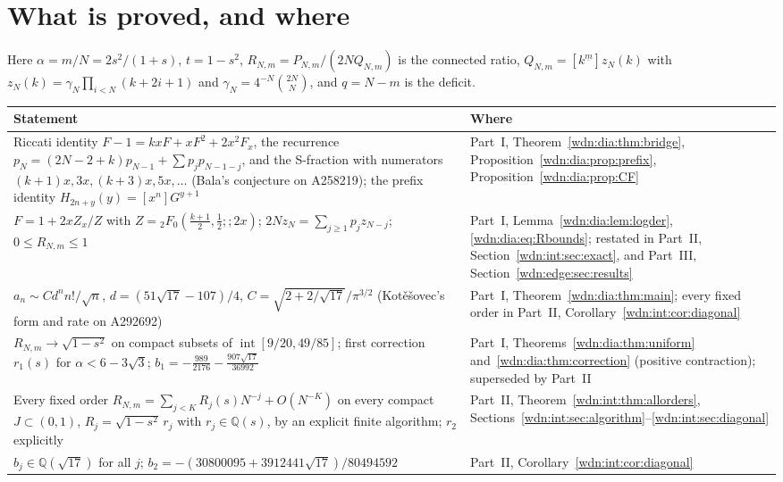 \documentclass[11pt,letterpaper]{article}
\theoremstyle{remark}\newtheorem{remark}[theorem]{Remark}
\newcommand{\fall}[2]{#1^{\underline{#2}}}
\newcommand{\Q}{\mathbb Q}
\begin{document}
\section*{What is proved, and where}\label{wdn:sec:status}
Here $\alpha=m/N=2s^2/(1+s)$, $t=1-s^2$, $R_{N,m}=P_{N,m}/(2NQ_{N,m})$ is the connected ratio, $Q_{N,m}=[\fall km]z_N(k)$ with $z_N(k)=\gamma_N\prod_{i<N}(k+2i+1)$ and $\gamma_N=4^{-N}\binom{2N}N$, and $q=N-m$ is the deficit.
\begin{center}
\small
\begin{tabular}{@{}>{\raggedright\arraybackslash}p{} >{\raggedright\arraybackslash}p{}@{}}
\toprule
Statement & Where\\
\midrule
Riccati identity $F-1=kxF+xF^2+2x^2F_x$, the recurrence $p_N=(2N-2+k)p_{N-1}+\sum p_jp_{N-1-j}$, and the S-fraction with numerators $(k+1)x,3x,(k+3)x,5x,\ldots$ (Bala's conjecture on A258219); the prefix identity $H_{2n+y}(y)=[x^n]G^{y+1}$ & Part~I, Theorem~\ref{wdn:dia:thm:bridge}, Proposition~\ref{wdn:dia:prop:prefix}, Proposition~\ref{wdn:dia:prop:CF}\\
$F=1+2xZ_x/Z$ with $Z={}_2F_0(\frac{k+1}2,\frac12;;2x)$; $2Nz_N=\sum_{j\ge1}p_jz_{N-j}$; $0\le R_{N,m}\le1$ & Part~I, Lemma~\ref{wdn:dia:lem:logder}, \eqref{wdn:dia:eq:Rbounds}; restated in Part~II, Section~\ref{wdn:int:sec:exact}, and Part~III, Section~\ref{wdn:edge:sec:results}\\
$a_n\sim Cd^nn!/\sqrt n$, $d=(51\sqrt{17}-107)/4$, $C=\sqrt{2+2/\sqrt{17}}/\pi^{3/2}$ (Kot\v{e}\v{s}ovec's form and rate on A292692) & Part~I, Theorem~\ref{wdn:dia:thm:main}; every fixed order in Part~II, Corollary~\ref{wdn:int:cor:diagonal}\\
$R_{N,m}\to\sqrt{1-s^2}$ on compact subsets of $\operatorname{int}[9/20,49/85]$; first correction $r_1(s)$ for $\alpha<6-3\sqrt3$; $b_1=-\frac{989}{2176}-\frac{907\sqrt{17}}{36992}$ & Part~I, Theorems~\ref{wdn:dia:thm:uniform} and~\ref{wdn:dia:thm:correction} (positive contraction); superseded by Part~II\\
Every fixed order $R_{N,m}=\sum_{j<K}R_j(s)N^{-j}+O(N^{-K})$ on every compact $J\subset(0,1)$, $R_j=\sqrt{1-s^2}\,r_j$ with $r_j\in\Q(s)$, by an explicit finite algorithm; $r_2$ explicitly & Part~II, Theorem~\ref{wdn:int:thm:allorders}, Sections~\ref{wdn:int:sec:algorithm}--\ref{wdn:int:sec:diagonal}\\
$b_j\in\Q(\sqrt{17})$ for all $j$; $b_2=-(30800095+3912441\sqrt{17})/80494592$ & Part~II, Corollary~\ref{wdn:int:cor:diagonal}\\

\end{tabular}
\end{center}
\end{document}
